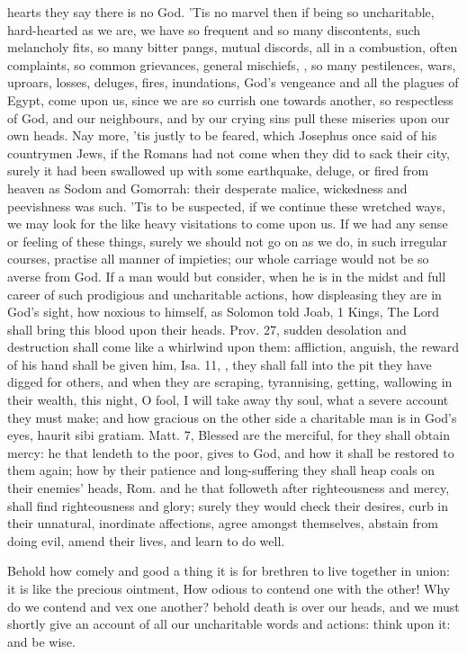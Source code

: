 {hearts they say there is no God. 'Tis no marvel then if being so
uncharitable, hard-hearted as we are, we have so frequent and so many
discontents, such melancholy fits, so many bitter pangs, mutual
discords, all in a combustion, often complaints, so common grievances,
general mischiefs, , so many pestilences, wars, uproars,
losses, deluges, fires, inundations, God's vengeance and all the
plagues of Egypt, come upon us, since we are so currish one towards
another, so respectless of God, and our neighbours, and by our crying
sins pull these miseries upon our own heads. Nay more, 'tis justly to
be feared, which Josephus once said of his countrymen Jews, if
the Romans had not come when they did to sack their city, surely it had
been swallowed up with some earthquake, deluge, or fired from heaven as
Sodom and Gomorrah: their desperate malice, wickedness and peevishness
was such. 'Tis to be suspected, if we continue these wretched ways, we
may look for the like heavy visitations to come upon us. If we had any
sense or feeling of these things, surely we should not go on as we do,
in such irregular courses, practise all manner of impieties; our whole
carriage would not be so averse from God. If a man would but consider,
when he is in the midst and full career of such prodigious and
uncharitable actions, how displeasing they are in God's sight, how
noxious to himself, as Solomon told Joab, 1 Kings,  The Lord shall
bring this blood upon their heads. Prov.  27, sudden desolation and
destruction shall come like a whirlwind upon them: affliction, anguish,
the reward of his hand shall be given him, Isa.  11, \etc{}, they
shall fall into the pit they have digged for others, and when they are
scraping, tyrannising, getting, wallowing in their wealth, this night,
O fool, I will take away thy soul, what a severe account they must
make; and how gracious on the other side a charitable man is in
God's eyes, haurit sibi gratiam. Matt.  7, Blessed are the merciful,
for they shall obtain mercy: he that lendeth to the poor, gives to God,
and how it shall be restored to them again; how by their patience and
long-suffering they shall heap coals on their enemies' heads, Rom. 
and he that followeth after righteousness and mercy, shall find
righteousness and glory; surely they would check their desires, curb in
their unnatural, inordinate affections, agree amongst themselves,
abstain from doing evil, amend their lives, and learn to do well.

Behold how comely and good a thing it is for brethren to live together
in union: it is like the precious ointment, \etc{} How odious to
contend one with the other!   Why do we contend and
vex one another? behold death is over our heads, and we must shortly
give an account of all our uncharitable words and actions: think upon
it: and be wise.
}
